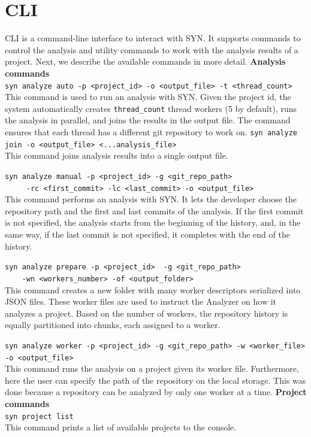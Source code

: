 \section{CLI}
CLI is a command-line interface to interact with SYN. It supports commands to control the analysis and utility commands to work with the analysis results of a project. Next, we describe the available commands in more detail.
\bigbreak
\noindent
\textbf{Analysis commands}\\
\noindent
\verb|syn analyze auto -p <project_id> -o <output_file> -t <thread_count>|\\
\indent
This command is used to run an analysis with SYN. 
Given the project id, the system automatically creates \texttt{thread\_count} thread workers (5 by default), runs the analysis in parallel, and joins the results in the output file. The command ensures that each thread has a different git repository to work on. 
\bigbreak
\noindent
\verb|syn analyze join -o <output_file> <...analysis_file>|\\
\indent
This command joins analysis results into a single output file.

\bigbreak
\noindent
\verb|syn analyze manual -p <project_id> -g <git_repo_path> | \\
\verb|     -rc <first_commit> -lc <last_commit> -o <output_file>|\\
\indent
This command performs an analysis with SYN. It lets the developer choose the repository path and the first and last commits of the analysis. 
If the first commit is not specified, the analysis starts from the beginning of the history, and, in the same way, if the last commit is not specified, it completes with the end of the history. 


\bigbreak
\noindent
\verb|syn analyze prepare -p <project_id>  -g <git_repo_path> |\\
\verb|    -wn <workers_number> -of <output_folder>| \\
\indent
This command creates a new folder with many worker descriptors serialized into JSON files. These worker files are used to instruct the Analyzer on how it analyzes a project.
Based on the number of workers, the repository history is equally partitioned into chunks, each assigned to a worker. 


\bigbreak
\noindent
\verb|syn analyze worker -p <project_id> -g <git_repo_path> -w <worker_file> -o <output_file>|\\
\indent
This command runs the analysis on a project given its worker file. 
Furthermore, here the user can specify the path of the repository on the local storage. This was done because a repository can be analyzed by only one worker at a time.
\bigbreak
\noindent
\textbf{Project commands}\\
\noindent
\verb|syn project list| \\
\indent
This command prints a list of available projects to the console.

